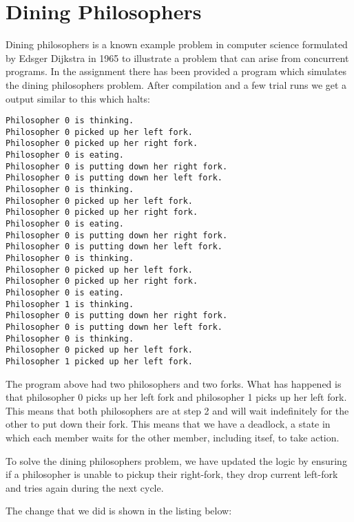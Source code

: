 \section{Dining Philosophers}

Dining philosophers is a known example problem in computer science formulated
by Edsger Dijkstra in 1965 to illustrate a problem that can arise from concurrent
programs. In the assignment there has been provided a program which simulates
the dining philosophers problem. After compilation and a few trial runs we get
a output similar to this which halts:

\begin{lstlisting}[caption=Output from the dining philosophers program.]
Philosopher 0 is thinking.
Philosopher 0 picked up her left fork.
Philosopher 0 picked up her right fork.
Philosopher 0 is eating.
Philosopher 0 is putting down her right fork.
Philosopher 0 is putting down her left fork.
Philosopher 0 is thinking.
Philosopher 0 picked up her left fork.
Philosopher 0 picked up her right fork.
Philosopher 0 is eating.
Philosopher 0 is putting down her right fork.
Philosopher 0 is putting down her left fork.
Philosopher 0 is thinking.
Philosopher 0 picked up her left fork.
Philosopher 0 picked up her right fork.
Philosopher 0 is eating.
Philosopher 1 is thinking.
Philosopher 0 is putting down her right fork.
Philosopher 0 is putting down her left fork.
Philosopher 0 is thinking.
Philosopher 0 picked up her left fork.
Philosopher 1 picked up her left fork.
\end{lstlisting}

The program above had two philosophers and two forks. What has happened is that 
philosopher 0 picks up her left fork and philosopher 1 picks up her left fork.
This means that both philosophers are at step 2 and will wait indefinitely for
the other to put down their fork. This means that we have a deadlock, a state in 
which each member waits for the other member, including itsef, to take action.

To solve the dining philosophers problem, we have updated the logic by ensuring 
if a philosopher is unable to pickup their right-fork, they drop current left-fork 
and tries again during the next cycle.

The change that we did is shown in the listing below:

